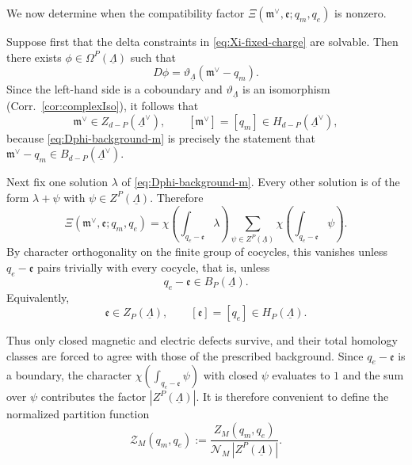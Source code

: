 We now determine when the compatibility factor
\(\Xi(\mathfrak m^\vee,\mathfrak e;q_m,q_e)\) is nonzero.

Suppose first that the delta constraints in \eqref{eq:Xi-fixed-charge} are solvable. Then
there exists \(\phi\in \Omega^P(\underline\Lambda)\) such that
\begin{equation}
	D\phi=\vartheta_{\underline\Lambda}(\mathfrak m^\vee-q_m).
	\label{eq:Dphi-background-m}
\end{equation}
Since the left-hand side is a coboundary and $\vartheta_{\underline\Lambda}$ is an isomorphism (Corr.~\ref{cor:complexIso}), it follows that
\begin{equation}
	\mathfrak m^\vee\in Z_{d-P}(\underline\Lambda^\vee),
	\qquad
	[\mathfrak m^\vee]=[q_m]\in H_{d-P}(\underline\Lambda^\vee),
	\label{eq:magnetic-homology-class}
\end{equation}
because \eqref{eq:Dphi-background-m} is precisely the statement that
\(\mathfrak m^\vee-q_m\in B_{d-P}(\underline\Lambda^\vee)\).

Next fix one solution \(\lambda\) of \eqref{eq:Dphi-background-m}. Every other solution is
of the form \(\lambda+\psi\) with \(\psi\in Z^P(\underline\Lambda)\). Therefore
\begin{equation}
	\Xi(\mathfrak m^\vee,\mathfrak e;q_m,q_e)
	=
	\chi \left(\int_{q_e-\mathfrak e}\lambda\right)
	\sum_{\psi\in Z^P(\underline\Lambda)}
	\chi \left(\int_{q_e-\mathfrak e}\psi\right).
	\label{eq:Xi-affine-flat-sum}
\end{equation}
By character orthogonality on the finite group of cocycles, this vanishes unless
\(q_e-\mathfrak e\) pairs trivially with every cocycle, that is, unless
\begin{equation}
	q_e-\mathfrak e\in B_P(\underline\Lambda).
\end{equation}
Equivalently,
\begin{equation}
	\mathfrak e\in Z_P(\underline\Lambda),
	\qquad
	[\mathfrak e]=[q_e]\in H_P(\underline\Lambda).
	\label{eq:electric-homology-class}
\end{equation}

Thus only closed magnetic and electric defects survive, and their total homology classes are
forced to agree with those of the prescribed background. Since $q_e-\mathfrak e$ is a boundary, the character $\chi\left(\int_{q_e-\mathfrak e}\psi\right)$ with closed $\psi$ evaluates to $1$ and the sum over $\psi$ contributes the factor \(|Z^P(\underline\Lambda)|\). It is therefore convenient to define the normalized partition function
\begin{equation}
	\mathcal Z_M(q_m,q_e)
	:=
	\frac{Z_M(q_m,q_e)}
	{\mathcal N_M\,|Z^P(\underline\Lambda)|}.
	\label{eq:normalized-closed-defect-gas}
\end{equation}

